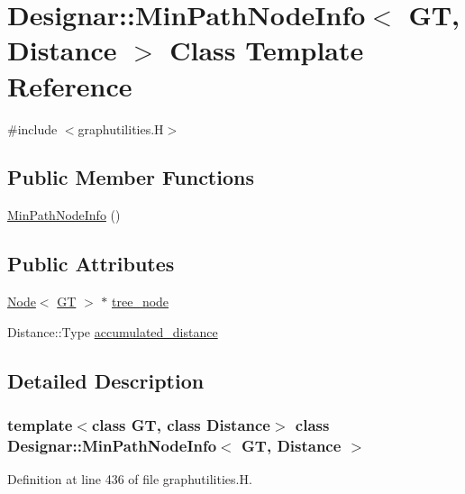\hypertarget{class_designar_1_1_min_path_node_info}{}\section{Designar\+:\+:Min\+Path\+Node\+Info$<$ GT, Distance $>$ Class Template Reference}
\label{class_designar_1_1_min_path_node_info}


{\ttfamily \#include $<$graphutilities.\+H$>$}

\subsection*{Public Member Functions}
\begin{DoxyCompactItemize}
\item 
\hyperlink{class_designar_1_1_min_path_node_info_a50c93fccfecfd75d3aa7637be108ef4d}{Min\+Path\+Node\+Info} ()
\end{DoxyCompactItemize}
\subsection*{Public Attributes}
\begin{DoxyCompactItemize}
\item 
\hyperlink{namespace_designar_a5af326c65aa2bd26b26c410f2030d09e}{Node}$<$ \hyperlink{demo-buildgraph_8_c_a3001c40d2c31ca87ed96cd7d1334a55e}{GT} $>$ $\ast$ \hyperlink{class_designar_1_1_min_path_node_info_a0121695ed8523a60ee92375767a5c169}{tree\+\_\+node}
\item 
Distance\+::\+Type \hyperlink{class_designar_1_1_min_path_node_info_acd8b2664b0726bf26b0f66213e4f1e4b}{accumulated\+\_\+distance}
\end{DoxyCompactItemize}


\subsection{Detailed Description}
\subsubsection*{template$<$class GT, class Distance$>$\newline
class Designar\+::\+Min\+Path\+Node\+Info$<$ G\+T, Distance $>$}



Definition at line 436 of file graphutilities.\+H.



